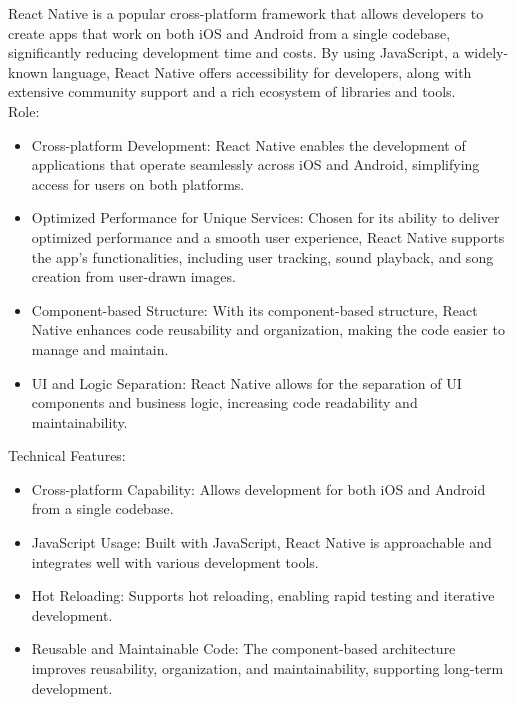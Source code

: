 \documentclass[conference]{IEEEtran}
\begin{document}
\noindent React Native is a popular cross-platform framework that allows developers to create apps that work on both iOS and Android from a single codebase, significantly reducing development time and costs. By using JavaScript, a widely-known language, React Native offers accessibility for developers, along with extensive community support and a rich ecosystem of libraries and tools.\\

Role:
\begin{itemize}
    \item Cross-platform Development: React Native enables the development of applications that operate seamlessly across iOS and Android, simplifying access for users on both platforms.\\
    \item Optimized Performance for Unique Services: Chosen for its ability to deliver optimized performance and a smooth user experience, React Native supports the app’s functionalities, including user tracking, sound playback, and song creation from user-drawn images.\\
    \item Component-based Structure: With its component-based structure, React Native enhances code reusability and organization, making the code easier to manage and maintain.\\
    \item UI and Logic Separation: React Native allows for the separation of UI components and business logic, increasing code readability and maintainability.\\
\end{itemize}

Technical Features:
\begin{itemize}
    \item Cross-platform Capability: Allows development for both iOS and Android from a single codebase.\\
    \item JavaScript Usage: Built with JavaScript, React Native is approachable and integrates well with various development tools.
    \item Hot Reloading: Supports hot reloading, enabling rapid testing and iterative development.\\
    \item Reusable and Maintainable Code: The component-based architecture improves reusability, organization, and maintainability, supporting long-term development.\\
\end{itemize}
\end{document}
